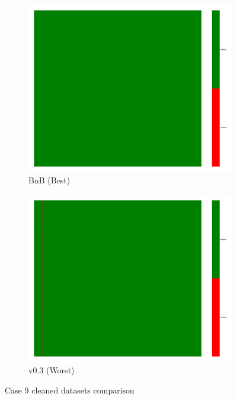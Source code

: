 \documentclass[a4paper,12pt]{article}
\begin{document}
\begin{figure}[H]
    \centering
    \begin{subfigure}{0.45\textwidth}
        \includegraphics[width=\linewidth]{case10_bnb_heatmap_cleaned.png}
        \caption{BnB (Best)}
    \end{subfigure}
    \hfill
    \begin{subfigure}{0.45\textwidth}
        \includegraphics[width=\linewidth]{case10_v0.3_heatmap_cleaned.png}
        \caption{v0.3 (Worst)}
    \end{subfigure}
    \caption{Case 9 cleaned datasets comparison}
\end{figure}
\end{document}
